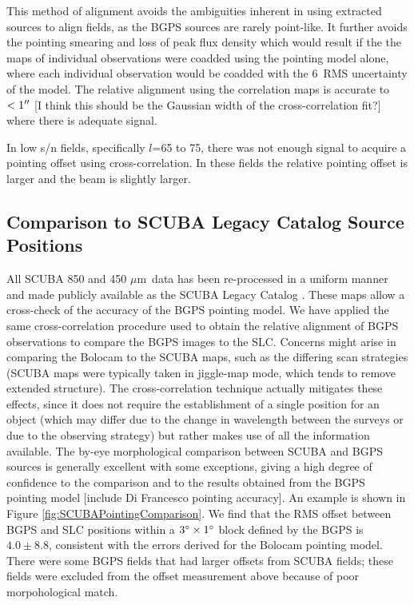 \documentclass[12pt,preprint]{aastex}
\newcommand{\mum}{\ensuremath{\mu \mathrm{m}}}
\newcommand{\lon}{\ensuremath{l}}
\begin{document}
This method of alignment avoids the ambiguities inherent in using extracted
sources to align fields, as the BGPS sources are rarely point-like.  It further
avoids the pointing smearing and loss of peak flux density which would result
if the the maps of individual observations were coadded using the pointing
model alone, where each individual observation would be coadded with the
6\arcsec\ RMS uncertainty of the model.  The relative alignment using the
correlation maps is accurate to $<1\mbox{$^{\prime\prime}$}$ [I think this should be the
Gaussian width of the cross-correlation fit?] where there is adequate signal.

In low s/n fields, specifically \lon=65 to 75, there was not enough signal to
acquire a pointing offset using cross-correlation.  In these fields the
relative pointing offset is larger and the beam is slightly larger.

\subsection{Comparison to SCUBA Legacy Catalog Source Positions}
\label{sec:SCUBAPointingComparison}

All SCUBA 850 and 450 \mum\ data has been re-processed in a uniform
manner and made publicly available as the SCUBA Legacy Catalog
\citep[][hereafter SLC]{difrancesco08}.  These maps allow a 
cross-check of the accuracy of the BGPS pointing model.  We have applied the same
cross-correlation procedure used to obtain the relative alignment of
BGPS observations to compare the BGPS images to the SLC.  Concerns might arise
in comparing the Bolocam to the SCUBA maps, such as the differing scan
strategies (SCUBA maps were typically taken in jiggle-map mode, which tends to
remove extended structure).  The cross-correlation technique actually
mitigates these effects, since it does not require the establishment of a
single position for an object (which may differ due to the change in wavelength
between the surveys or due to the observing strategy) but rather makes use of
all the information available.  The by-eye morphological comparison between SCUBA and
BGPS sources is generally excellent with some exceptions, giving a high degree
of confidence to the comparison and to the results obtained from the BGPS pointing
model [include Di Francesco pointing accuracy].  An example is shown in Figure \ref{fig:SCUBAPointingComparison}.  We
find that the RMS offset between BGPS and SLC positions within a $3\mbox{$^\circ$}
\times 1\mbox{$^\circ$}$ block defined by the BGPS is $4.0\pm8.8$\arcsec, consistent
with the errors derived for the Bolocam pointing model.  There were some BGPS
fields that had larger offsets from SCUBA fields; these fields were excluded
from the offset measurement above because of poor morpohological match.
\end{document}
